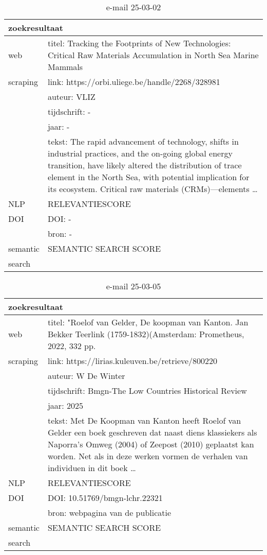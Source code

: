 \begin{table}[h!]
    \caption{e-mail 25-03-02}
    \centering
    \begin{tabularx}{\textwidth}{|p{4cm}|X|} 
        \hline
        \multicolumn{2}{|X|}{\textbf{zoekresultaat}} \\
        \hline
        web &titel: Tracking the Footprints of New Technologies: Critical Raw Materials Accumulation in North Sea Marine Mammals\\
        scraping&link: https://orbi.uliege.be/handle/2268/328981\\
        &auteur: VLIZ\\
        &tijdschrift: -\\
        &jaar: -\\
        &tekst: The rapid advancement of technology, shifts in industrial practices, and the on-going global energy transition, have likely altered the distribution of trace element in the North Sea, with potential implication for its ecosystem. Critical raw materials (CRMs)—elements …\\
        \hline
        NLP&RELEVANTIESCORE\\
        \hline
        DOI&DOI: -\\
        &bron: -\\
        \hline
        semantic&SEMANTIC SEARCH SCORE\\
        search&\\
        \hline
    \end{tabularx}
    \label{table:email20250302}
\end{table}
\begin{table}[h!]
    \caption{e-mail 25-03-05}
    \centering
    \begin{tabularx}{\textwidth}{|p{4cm}|X|} 
        \hline
        \multicolumn{2}{|X|}{\textbf{zoekresultaat}} \\
        \hline
        web &titel:  "Roelof van Gelder, De koopman van Kanton. Jan Bekker Teerlink (1759-1832)(Amsterdam: Prometheus, 2022, 332 pp.\\
        scraping&link: https://lirias.kuleuven.be/retrieve/800220\\
        &auteur: W De Winter\\
        &tijdschrift: Bmgn-The Low Countries Historical Review\\
        &jaar: 2025\\
        &tekst: Met De Koopman van Kanton heeft Roelof van Gelder een boek geschreven dat naast diens klassiekers als Naporra’s Omweg (2004) of Zeepost (2010) geplaatst kan worden. Net als in deze werken vormen de verhalen van individuen in dit boek …\\
        \hline
        NLP&RELEVANTIESCORE\\
        \hline
        DOI&DOI: 10.51769/bmgn-lchr.22321\\
        &bron: webpagina van de publicatie\\
        \hline
        semantic&SEMANTIC SEARCH SCORE\\
        search&\\
        \hline
    \end{tabularx}
    \label{table:email20250305}
\end{table}
